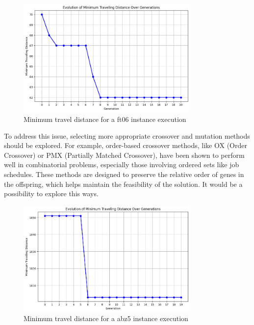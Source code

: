 \documentclass[11pt, a4paper]{article}
\begin{document}
\begin{figure}[H]
    \centering
    \includegraphics[width=0.8\textwidth]{media/minimum_travel_distance_ft06.png}
    \caption{Minimum travel distance for a ft06 instance execution}
    \label{fig:image_16}
\end{figure}

\vspace{1em} To address this issue, selecting more appropriate crossover and mutation methods should be explored. For example, order-based crossover methods, like OX (Order Crossover) 
or PMX (Partially Matched Crossover), have been shown to perform well in combinatorial problems, especially those involving ordered sets like job schedules. These methods are designed 
to preserve the relative order of genes in the offspring, which helps maintain the feasibility of the solution. It would be a possibility to explore this ways.

\begin{figure}[H]
    \centering
    \includegraphics[width=0.8\textwidth]{media/minimum_travel_distance_abz5.png}
    \caption{Minimum travel distance for a abz5 instance execution}
    \label{fig:image_17}
\end{figure}
\end{document}
